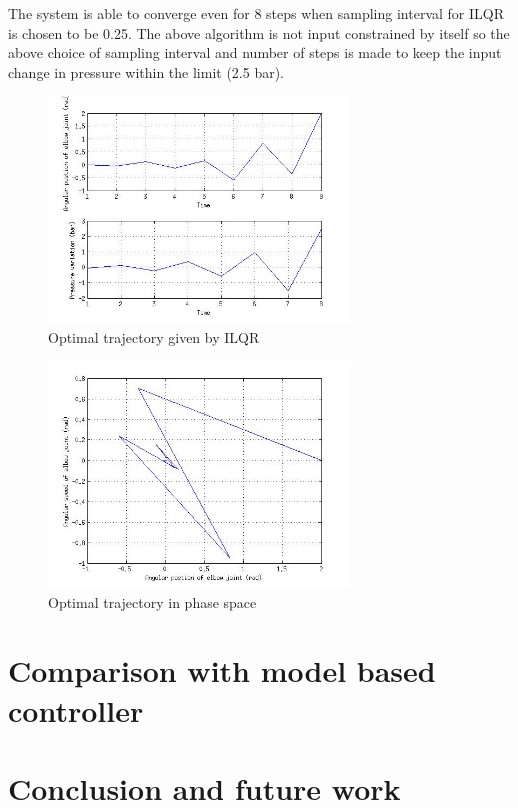 \documentclass[conference]{IEEEtran}
\begin{document}
The system is able to converge even for 8 steps when sampling interval for ILQR is chosen to be 0.25.
The above algorithm is not input constrained by itself so the above choice of sampling interval and number of steps is made to keep the input change in pressure within the limit (2.5 bar). 
\begin{figure}[ht!]
\centering
\includegraphics[width=80mm]{ilqrresponse1.jpg}
\caption{Optimal trajectory given by ILQR \label{Optimal trajectory}}
\end{figure}

\begin{figure}[ht!]
\centering
\includegraphics[width=80mm]{ilqrphaseresponse1.jpg}
\caption{Optimal trajectory in phase space \label{Optimal trajectory}}
\end{figure}
\section{Comparison with model based controller}

\section{Conclusion and future work}






\end{document}
